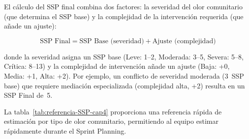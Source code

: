 El cálculo del SSP final combina dos factores: la severidad del olor comunitario (que determina el SSP base) y la complejidad de la intervención requerida (que añade un ajuste):

\begin{equation}
    \text{SSP Final} = \text{SSP Base (severidad)} + \text{Ajuste (complejidad)}
\end{equation}

\noindent donde la severidad asigna un SSP base (Leve: 1--2, Moderada: 3--5, Severa: 5--8, Crítica: 8--13) y la complejidad de intervención añade un ajuste (Baja: +0, Media: +1, Alta: +2). Por ejemplo, un conflicto de severidad moderada (3~SSP base) que requiere mediación especializada (complejidad alta, +2) resulta en un SSP Final de~5.

La tabla~\ref{tab:referencia-SSP-cap4} proporciona una referencia rápida de estimación por tipo de olor comunitario, permitiendo al equipo estimar rápidamente durante el Sprint Planning.

\begingroup
\scriptsize
\renewcommand{\arraystretch}{1.4}
\setlength{\tabcolsep}{4pt}
\setlength{\LTleft}{0pt}
\setlength{\LTright}{0pt}

